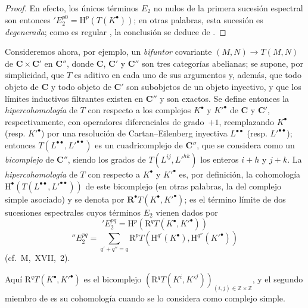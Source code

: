 \begin{proof}
En efecto, los únicos términos $E_2$ no nulos de la primera sucesión espectral  son entonces $'E_2^{p0}=\mathrm H^p(T(K^\bullet))$;
en otras palabras, esta sucesión es \emph{degenerada};
como es regular , la conclusión se deduce de .
\end{proof}

\begin{env}[11.4.6]
\label{0.11.4.6}
\label{0.11.4.6-fr}
Consideremos ahora, por ejemplo, un \emph{bifuntor} covariante $(M,N)\to T(M,N)$ de $\boldsymbol{C}\times\boldsymbol{C}'$ en $\boldsymbol{C}''$, donde $\boldsymbol{C}$, $\boldsymbol{C}'$ y $\boldsymbol{C}''$ son tres categorías abelianas;
se supone, por simplicidad, que $T$ es aditivo en cada uno de sus argumentos y, además, que todo objeto de $\boldsymbol{C}$ y todo objeto de $\boldsymbol{C}'$ son subobjetos de un objeto inyectivo,
y que los límites inductivos filtrantes existen en $\boldsymbol{C}''$ y son exactos.
Se define entonces la \emph{hipercohomología} de $T$ con respecto a los complejos $K^\bullet$ y $K'^\bullet$ de $\boldsymbol{C}$ y $\boldsymbol{C}'$, respectivamente, con operadores diferenciales de grado~$+1$, reemplazando $K^\bullet$ (resp. $K'^\bullet$) por una resolución de Cartan--Eilenberg inyectiva $L^{\bullet\bullet}$ (resp. $L'^{\bullet\bullet}$);
entonces $T(L^{\bullet\bullet},L'^{\bullet\bullet})$ es un cuadricomplejo de $\boldsymbol{C}''$, que se considera como un \emph{bicomplejo} de $\boldsymbol{C}''$, siendo los grados de $T(L^{ij},L'^{hk})$ los enteros $i+h$ y $j+k$.
La \emph{hipercohomología} de $T$ con respecto a $K^\bullet$ y $K'^\bullet$ es, por definición, la cohomología $\mathrm H^\bullet(T(L^{\bullet\bullet},L'^{\bullet\bullet}))$ de este bicomplejo (en otras palabras, la del complejo simple asociado) y se denota por $\mathbf R^\bullet T(K^\bullet,K'^\bullet)$;
es el término límite de dos sucesiones espectrales cuyos términos $E_2$ vienen dados por
\[
  \label{0.11.4.6.1-fr}
  'E_2^{pq}=\mathrm H^p(\mathrm R^qT(K^\bullet,K'^\bullet))
  \tag{11.4.6.1}
\]
\[
  \label{0.11.4.6.2-fr}
  ''E_2^{pq}=\sum_{q'+q''=q}
  \mathrm R^pT(\mathrm H^{q'}(K^\bullet),\mathrm H^{q''}(K'^\bullet))
  \tag{11.4.6.2}
\]
(cf.~M,~XVII,~2).

Aquí $\mathrm R^qT(K^\bullet,K'^\bullet)$ es el bicomplejo $(\mathrm R^qT(K^i,K'^j))_{(i,j)\in\mathbb Z\times\mathbb Z}$, y el segundo miembro de  es su cohomología cuando se lo considera como complejo simple.


\end{env}
